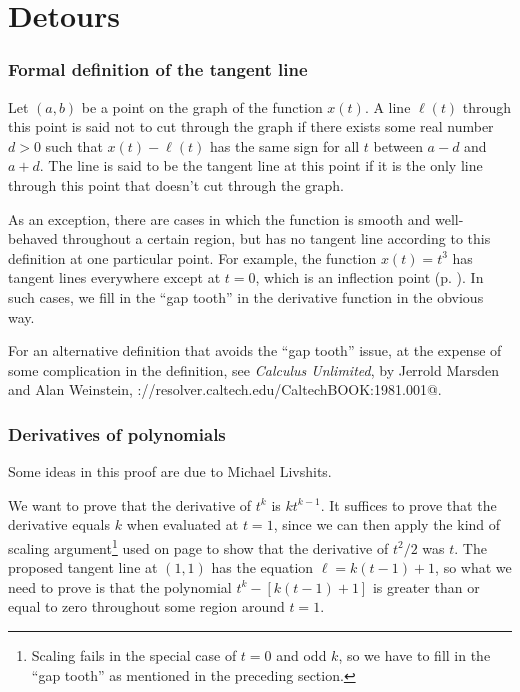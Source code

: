 \chapter{Detours}

\newcommand{\detour}[2]{\subsection{#2}\label{detour:#1}}

\vfill

\detour{def-tangent}{Formal definition of the tangent line}

Let $(a,b)$ be a point on the graph of the function $x(t)$.
A line $\ell(t)$ through this point is said not to cut through the graph
if there exists some real number $d>0$ such that
$x(t)-\ell(t)$ has the same sign for all $t$ between $a-d$ and $a+d$.
The line is said to be the tangent line at this point if it is the
only line through this point that doesn't cut through the graph.

As an exception,
there are cases in which the function is smooth and well-behaved throughout a certain
region, but has no tangent line according to this definition at one particular point.
For example, the function $x(t)=t^3$ has tangent lines everywhere except at $t=0$,
which is an inflection point (p. \pageref{inflection}). In such cases, we fill in the
``gap tooth'' in the derivative function in the obvious way.

For an alternative definition that avoids the ``gap tooth'' issue, at the expense
of some complication in the definition, see \emph{Calculus Unlimited}, by Jerrold
Marsden and Alan Weinstein, \verb@http://resolver.caltech.edu/CaltechBOOK:1981.001@.

\pagebreak

\detour{polynomial-proof}{Derivatives of polynomials}

Some ideas in this proof are due to Michael Livshits.

We want to prove that the derivative of $t^k$ is $kt^{k-1}$. It suffices to
prove that the derivative equals $k$ when evaluated at $t=1$, since we can
then apply the kind of scaling argument\footnote{Scaling fails in the special case of $t=0$ and odd $k$,
so we have to fill in the ``gap tooth''
as mentioned in the preceding section.} used on page \pageref{scaling} to
show that the derivative of $t^2/2$ was $t$. The proposed tangent line at $(1,1)$
has the equation $\ell=k(t-1)+1$, so what we need to prove is that
the polynomial $t^k-[k(t-1)+1]$ is greater than or equal to zero throughout some
region around $t=1$.

